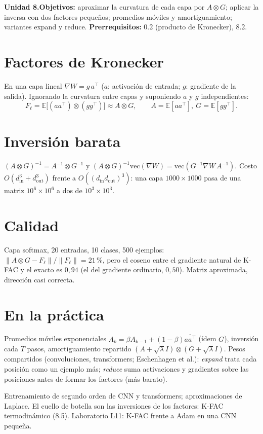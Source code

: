 \documentclass[11pt,a4paper]{article}
\begin{document}

\noindent\textbf{Unidad 8.}\quad\textbf{Objetivos:} aproximar la curvatura de cada capa por $A\otimes G$; aplicar la inversa con dos factores pequeños; promedios
móviles y amortiguamiento; variantes expand y reduce.
\textbf{Prerrequisitos:} 0.2 (producto de Kronecker), 8.2.

\section{Factores de Kronecker}
En una capa lineal $\nabla W=g\,a^\top$ ($a$: activación de entrada; $g$: gradiente de la salida). Ignorando la curvatura entre capas y suponiendo $a$ y $g$
independientes:
\[F_\ell=\mathbb E\big[(aa^\top)\otimes(gg^\top)\big]\approx A\otimes G,\qquad A=\mathbb E[aa^\top],\ G=\mathbb E[gg^\top].\]

\section{Inversión barata}
$(A\otimes G)^{-1}=A^{-1}\otimes G^{-1}$ y $(A\otimes G)^{-1}\mathrm{vec}(\nabla W)=\mathrm{vec}(G^{-1}\nabla W\,A^{-1})$. Costo $O(d_\text{in}^3+d_\text{out}^3)$ frente a
$O((d_\text{in}d_\text{out})^3)$: una capa $1000\times1000$ pasa de una matriz $10^6\times10^6$ a dos de $10^3\times10^3$.

\section{Calidad \evS}
Capa softmax, 20 entradas, 10 clases, 500 ejemplos: $\|A\otimes G-F_\ell\|/\|F_\ell\|=21\,\%$, pero el coseno entre el gradiente natural de K-FAC y el exacto
es $0{,}94$ (el del gradiente ordinario, $0{,}50$). Matriz aproximada, dirección casi correcta.

\section{En la práctica}
Promedios móviles exponenciales $A_k=\beta A_{k-1}+(1-\beta)\overline{aa^\top}$ (ídem $G$), inversión cada $T$ pasos, amortiguamiento repartido
$(A+\sqrt\lambda I)\otimes(G+\sqrt\lambda I)$. Pesos compartidos (convoluciones, transformers; Eschenhagen et al.): \emph{expand} trata cada posición como un ejemplo
más; \emph{reduce} suma activaciones y gradientes sobre las posiciones antes de formar los factores (más barato).

\begin{aplicacion}
Entrenamiento de segundo orden de CNN y transformers; aproximaciones de Laplace. El cuello de botella son las inversiones de los factores: K-FAC termodinámico (8.5).
Laboratorio L11: K-FAC frente a Adam en una CNN pequeña.
\end{aplicacion}
\end{document}
